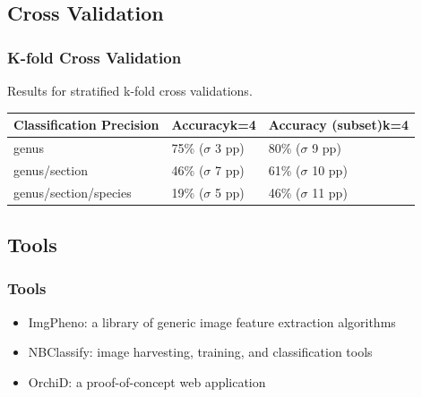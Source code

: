 \documentclass[]{beamer}
\begin{document}
    \subsection{Cross Validation}

    \begin{frame}
        \frametitle{K-fold Cross Validation}

        Results for stratified k-fold cross validations.

        \begin{table}[h]\scriptsize
            \begin{center}
            \begin{tabular}{lp{3cm}p{3cm}}
            \toprule
            \textbf{Classification Precision} & \textbf{Accuracy{\newline}k=4} & \textbf{Accuracy (subset){\newline}k=4} \\
            \midrule
            genus                   & 75\% ({$\sigma$} 3 pp)    & 80\% ({$\sigma$} 9 pp) \\
            genus/section           & 46\% ({$\sigma$} 7 pp)    & 61\% ({$\sigma$} 10 pp) \\
            genus/section/species   & 19\% ({$\sigma$} 5 pp)    & 46\% ({$\sigma$} 11 pp) \\
            \bottomrule
            \end{tabular}
            \end{center}
        \end{table}
    \end{frame}

    \subsection{Tools}

    \begin{frame}
        \frametitle{Tools}

        \begin{itemize}
            \item ImgPheno: a library of generic image feature extraction algorithms
            \item NBClassify: image harvesting, training, and classification tools
            \item OrchiD: a proof-of-concept web application
        \end{itemize}
    \end{frame}
\end{document}
